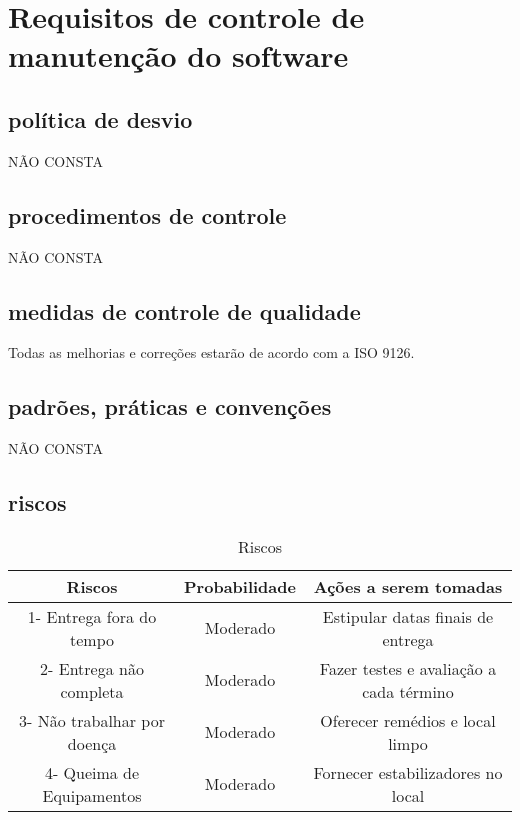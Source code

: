 \chapter{Requisitos de controle de manutenção do software}

\section{política de desvio}
NÃO CONSTA
\section{procedimentos de controle}
NÃO CONSTA
\section{medidas de controle de qualidade}
Todas as melhorias e correções  estarão de acordo com a ISO 9126.
\section{padrões, práticas e convenções}
NÃO CONSTA
\section{riscos}
\begin{table}[!htb]
	\caption[Riscos]{Riscos}
	\label{tab:riscos}
	\centering
	\begin{tabular}{c|c|c}
		Riscos                           &  Probabilidade        &  Ações a serem tomadas	                          \\ \hline
		1- Entrega fora do tempo         &  Moderado             &  Estipular datas finais de entrega    						\\
	  2- Entrega não completa          & 	Moderado	           &  Fazer testes e avaliação a cada término         \\
    3- Não trabalhar por doença      & 	Moderado	           &  Oferecer remédios e local limpo                 \\
    4- Queima de Equipamentos		& Moderado		& Fornecer estabilizadores no local \\
	\end{tabular}
\end{table}

